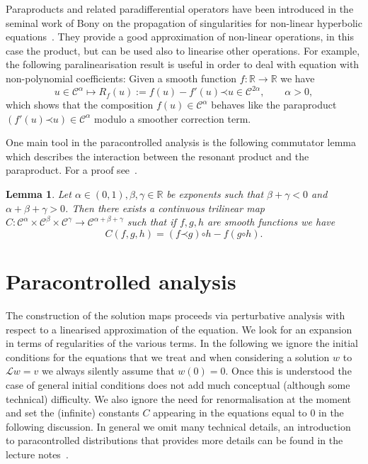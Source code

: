 \documentclass[a4paper, 11pt]{article}
\newcommand{\assign}{:=}
\newtheorem{lemma}[theorem]{Lemma}
\newcommand{\para}{\mathord{\prec}}
\newcommand{\reso}{\mathord{\circ}}
\begin{document}
Paraproducts and related paradifferential operators have been introduced in
the seminal work of Bony on the propagation of singularities for non-linear
hyperbolic equations~{\cite{bony_calcul_1981,meyer_remarques_1981}}. They
provide a good approximation of non-linear operations, in this case the
product, but can be used also to linearise other operations. For example, the
following paralinearisation result is useful in order to deal with equation
with non-polynomial coefficients: Given a smooth function $f : \mathbb{R}
\rightarrow \mathbb{R}$ we have
\begin{equation}
  u \in \mathcal{C}^{\alpha} \mapsto R_f (u) \assign f (u) - f' (u) \para u
  \in \mathcal{C}^{2 \alpha}, \qquad \alpha > 0, \label{eq:paralinearization}
\end{equation}
which shows that the composition $f (u) \in \mathcal{C}^{\alpha}$ behaves like
the paraproduct $(f' (u) \para u) \in \mathcal{C}^{\alpha}$ modulo a smoother
correction term.

One main tool in the paracontrolled analysis is the following commutator
lemma which describes the interaction between the resonant product and the
paraproduct. For a proof see~{\cite{gubinelli_paracontrolled_2015}}.

\begin{lemma}
  \label{lemma:commutator}Let $\alpha \in (0, 1), \beta, \gamma \in
  \mathbb{R}$ be exponents such that $\beta + \gamma < 0$ and $\alpha + \beta
  + \gamma > 0$. Then there exists a continuous trilinear map $C :
  \mathcal{C}^{\alpha} \times \mathcal{C}^{\beta} \times \mathcal{C}^{\gamma}
  \rightarrow \mathcal{C}^{\alpha + \beta + \gamma}$ such that if $f, g, h$
  are smooth functions we have
  \[ C (f, g, h) = (f \para g) \reso h - f (g \reso h) . \]
\end{lemma}

\section{Paracontrolled analysis}\label{sec:paracontrolled}

The construction of the solution maps proceeds via perturbative analysis with
respect to a linearised approximation of the equation. We look for an
expansion in terms of regularities of the various terms. In the following we ignore the initial conditions for the equations that we treat and when
considering a solution $w$ to $\mathcal{L}w = v$ we always silently assume
that $w (0) = 0$. Once this is understood the case of general initial
conditions does not add much conceptual (although some technical) difficulty. We also ignore the need for renormalisation at the moment and set the (infinite) constants $C$ appearing in the equations equal to $0$ in the following discussion. In general we omit many technical details, an introduction to paracontrolled distributions that provides more details can be found in the lecture notes~\cite{gubinelli_lectures_2015}.
\end{document}

